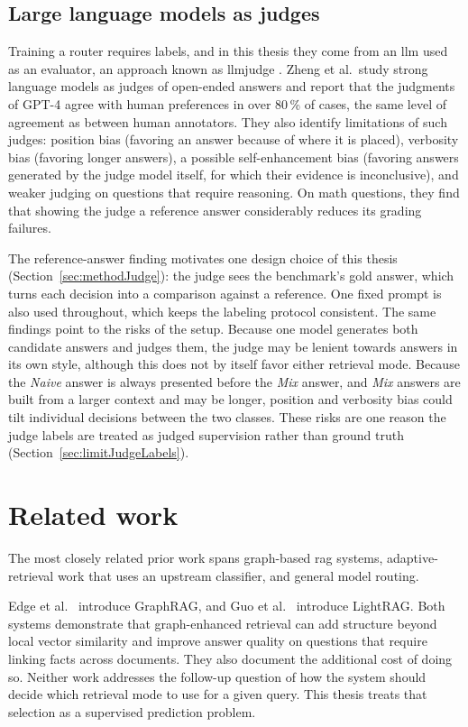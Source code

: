 \documentclass[english, bibtex]{kththesis}               %
\numberwithin{listing}{chapter}
\begin{document}
\subsection{Large language models as judges}
\label{sec:backgroundJudge}

Training a router requires labels, and in this thesis they come from an \gls{llm} used as an evaluator, an approach known as \gls{llmjudge} \cite{zheng2023judge}. Zheng et al.\ study strong language models as judges of open-ended answers and report that the judgments of GPT-4 agree with human preferences in over 80\,\% of cases, the same level of agreement as between human annotators. They also identify limitations of such judges: position bias (favoring an answer because of where it is placed), verbosity bias (favoring longer answers), a possible self-enhancement bias (favoring answers generated by the judge model itself, for which their evidence is inconclusive), and weaker judging on questions that require reasoning. On math questions, they find that showing the judge a reference answer considerably reduces its grading failures.

The reference-answer finding motivates one design choice of this thesis (Section~\ref{sec:methodJudge}): the judge sees the benchmark's gold answer, which turns each decision into a comparison against a reference. One fixed prompt is also used throughout, which keeps the labeling protocol consistent. The same findings point to the risks of the setup. Because one model generates both candidate answers and judges them, the judge may be lenient towards answers in its own style, although this does not by itself favor either retrieval mode. Because the \emph{Naive} answer is always presented before the \emph{Mix} answer, and \emph{Mix} answers are built from a larger context and may be longer, position and verbosity bias could tilt individual decisions between the two classes. These risks are one reason the judge labels are treated as judged supervision rather than ground truth (Section~\ref{sec:limitJudgeLabels}).

\section{Related work}
\label{sec:relatedWork}

The most closely related prior work spans graph-based \gls{rag} systems, adaptive-retrieval work that uses an upstream classifier, and general model routing.

Edge et al.\ \cite{edge2024graphrag} introduce GraphRAG, and Guo et al.\ \cite{lightrag2024} introduce LightRAG. Both systems demonstrate that graph-enhanced retrieval can add structure beyond local vector similarity and improve answer quality on questions that require linking facts across documents. They also document the additional cost of doing so. Neither work addresses the follow-up question of how the system should decide which retrieval mode to use for a given query. This thesis treats that selection as a supervised prediction problem.
\end{document}
